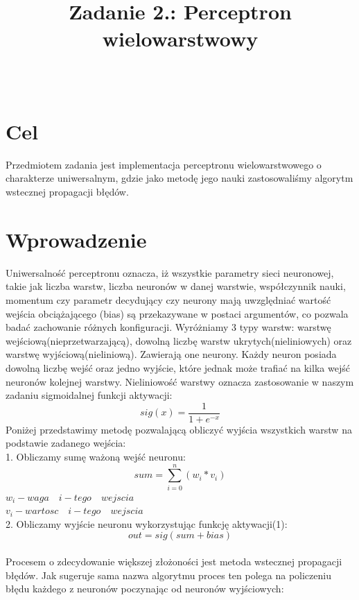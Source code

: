 \documentclass{classrep}
\author{%
  \studentinfo[203943@edu.p.lodz.pl]{Jakub Mielczarek}{203943}\\
  \studentinfo[203882@edu.p.lodz.pl]{Łukasz Gołębiewski}{203882}%
}
\title{Zadanie 2.: Perceptron wielowarstwowy}
\begin{document}
 
\maketitle 
\thispagestyle{fancyplain}

\section{Cel}
{\color{black}
Przedmiotem zadania jest implementacja perceptronu wielowarstwowego o charakterze uniwersalnym, gdzie jako metodę jego nauki zastosowaliśmy algorytm wstecznej propagacji błędów.

\section{Wprowadzenie}
{\color{black}
Uniwersalność perceptronu oznacza, iż wszystkie parametry sieci neuronowej, takie jak liczba warstw, liczba neuronów w danej warstwie, współczynnik nauki, momentum czy parametr decydujący czy neurony mają uwzględniać wartość wejścia obciążającego (bias) są przekazywane w postaci argumentów, co pozwala badać zachowanie różnych konfiguracji. 
Wyróżniamy 3 typy warstw: warstwę wejściową(nieprzetwarzającą), dowolną liczbę warstw ukrytych(nieliniowych) oraz warstwę wyjściową(nieliniową). Zawierają one neurony. Każdy neuron posiada dowolną liczbę wejść oraz jedno wyjście, które jednak może trafiać na kilka wejść neuronów kolejnej warstwy. Nieliniowość warstwy oznacza zastosowanie w naszym zadaniu sigmoidalnej funkcji aktywacji:
\begin{equation}
sig(x) = \dfrac{1}{1+e^{-x}}
\end{equation}
Poniżej przedstawimy metodę pozwalającą obliczyć wyjścia wszystkich warstw na podstawie zadanego wejścia:\\
1. Obliczamy sumę ważoną wejść neuronu:
\begin{equation}
sum = {\sum_{i=0}^{n} (w_i * v_i)} 
\end{equation}
$w_{i}  - waga \quad i-tego \quad wejscia $
\\
$v_{i}  - wartosc \quad i-tego \quad wejscia $\\
2. Obliczamy wyjście neuronu wykorzystując funkcję aktywacji(1):
\begin{equation}
out = sig(sum+bias)
\end{equation}
\\
Procesem o zdecydowanie większej złożoności jest metoda wstecznej propagacji błędów. Jak sugeruje sama nazwa algorytmu proces ten polega na policzeniu błędu każdego z neuronów poczynając od neuronów wyjściowych:
}}
\end{document}
